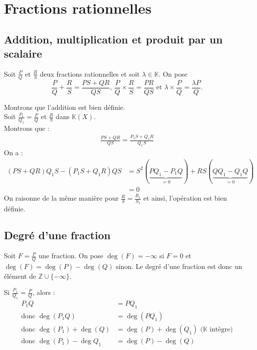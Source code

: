 \documentclass[../main.tex]{subfiles}
\begin{document}
\setcounter{chapter}{16}
\chapter{Fractions rationnelles}
\tableofcontents
\clearpage

\section{Addition, multiplication et produit par un scalaire}
\begin{tcolorbox}[title=Définition 17.2, title filled=false, colframe=orange, colback=orange!10!white]
    Soit $\frac{P}{Q}$ et $\frac{R}{S}$ deux fractions rationnelles et soit $\lambda \in \mathbb{K}$. On pose
    $$\frac{P}{Q} + \frac{R}{S} = \frac{PS + QR}{QS} \text{, } \frac{P}{Q} \times \frac{R}{S} = \frac{PR}{QS} \text{ et } \lambda \times \frac{P}{Q} = \frac{\lambda P}{Q}.$$
\end{tcolorbox}

\noindent Montrons que l'addition est bien définie. \\
Soit $\frac{P_1}{Q_1} = \frac{P}{Q}$ et $\frac{R}{S}$ dans $\mathbb{K}(X)$. \\
Montrons que : 
\begin{align*}
    \frac{PS + QR}{QS} = \frac{P_1S + Q_1R}{Q_1S}
\end{align*}
On a : 
\begin{align*}
    (PS + QR)Q_1S - (P_1S + Q_1R)QS &= S^2(\underbrace{PQ_1 - P_1Q}_{= 0}) + RS(\underbrace{QQ_1 - Q_1Q}_{= 0}) \\
    &= 0
\end{align*}
On raisonne de la même manière pour $\frac{R}{S} = \frac{R_1}{S_1}$ et ainsi, l'opération est bien définie. 

\section{Degré d'une fraction}
\begin{tcolorbox}[title=Définition 17.10, title filled=false, colframe=orange, colback=orange!10!white]
    Soit $F = \frac{P}{Q}$ une fraction. On pose $\deg(F) = -\infty$ si $F = 0$ et $\deg(F) = \deg(P) - \deg(Q)$ sinon. Le degré d'une fraction est donc un élément de $\mathbb{Z} \cup\{ -\infty \}$. 
\end{tcolorbox}

\noindent Si $\frac{P_1}{Q_1} = \frac{P}{Q}$, alors : 
\begin{align*}
    P_1Q &= PQ_1 \\
    \text{donc } \deg(P_1Q) &= \deg(PQ_1) \\
    \text{donc } \deg(P_1) + \deg(Q) &= \deg(P) + \deg(Q_1) \text{ ($\mathbb{K}$ intègre)} \\
    \text{donc } \deg(P_1) - \deg{Q_1} &= \deg(P) - \deg(Q)
\end{align*}
\end{document}
